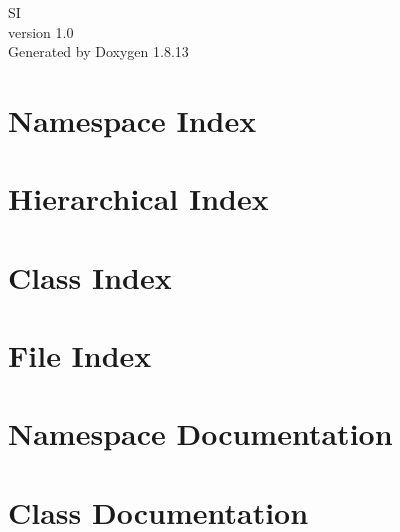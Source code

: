 \documentclass[twoside]{book}
\newcommand{\+}{\discretionary{\mbox{\scriptsize$\hookleftarrow$}}{}{}}
\newcommand{\clearemptydoublepage}{%
  \newpage{\pagestyle{empty}\cleardoublepage}%
}
\begin{document}
\hypersetup{pageanchor=false,
             bookmarksnumbered=true,
             pdfencoding=unicode
            }
\begin{titlepage}
\vspace*{7cm}
\begin{center}%
{\Large SI \\[1ex]\large version 1.\+0 }\\
\vspace*{1cm}
{\large Generated by Doxygen 1.8.13}\\
\end{center}
\end{titlepage}
\clearemptydoublepage
{}
\tableofcontents
\clearemptydoublepage
{}
\hypersetup{pageanchor=true}

\chapter{Namespace Index}

\chapter{Hierarchical Index}

\chapter{Class Index}

\chapter{File Index}

\chapter{Namespace Documentation}

\chapter{Class Documentation}























\end{document}
